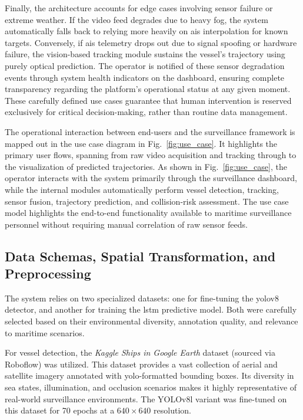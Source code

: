 Finally, the architecture accounts for edge cases involving sensor failure or extreme weather. If the video feed degrades due to heavy fog, the system automatically falls back to relying more heavily on \gls{ais} interpolation for known targets. Conversely, if \gls{ais} telemetry drops out due to signal spoofing or hardware failure, the vision-based tracking module sustains the vessel's trajectory using purely optical prediction. The operator is notified of these sensor degradation events through system health indicators on the dashboard, ensuring complete transparency regarding the platform's operational status at any given moment. These carefully defined use cases guarantee that human intervention is reserved exclusively for critical decision-making, rather than routine data management.
\begin{reportfigblock}
The operational interaction between end-users and the surveillance framework is mapped out in the use case diagram in Fig.~\ref{fig:use_case}. It highlights the primary user flows, spanning from raw video acquisition and tracking through to the visualization of predicted trajectories.
As shown in Fig.~\ref{fig:use_case}, the operator interacts with the system primarily through the surveillance dashboard, while the internal modules automatically perform vessel detection, tracking, sensor fusion, trajectory prediction, and collision-risk assessment. The use case model highlights the end-to-end functionality available to maritime surveillance personnel without requiring manual correlation of raw sensor feeds.
\end{reportfigblock}

\subsection{Data Schemas, Spatial Transformation, and Preprocessing}
The system relies on two specialized datasets: one for fine-tuning the \gls{yolov8} detector, and another for training the \gls{lstm} predictive model. Both were carefully selected based on their environmental diversity, annotation quality, and relevance to maritime scenarios.

For vessel detection, the \textit{Kaggle Ships in Google Earth} dataset (sourced via Roboflow) was utilized. This dataset provides a vast collection of aerial and satellite imagery annotated with \gls{yolo}-formatted bounding boxes. Its diversity in sea states, illumination, and occlusion scenarios makes it highly representative of real-world surveillance environments. The YOLOv8l variant was fine-tuned on this dataset for 70 epochs at a $640 \times 640$ resolution.

